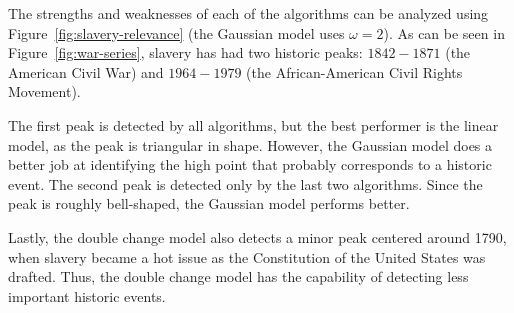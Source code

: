 The strengths and weaknesses of each of the algorithms can be analyzed using Figure~\ref{fig:slavery-relevance} (the Gaussian model uses $\omega = 2$). As can be seen in Figure~\ref{fig:war-series}, slavery has had two historic peaks: $1842 - 1871$ (the American Civil War) and $1964 - 1979$ (the African-American Civil Rights Movement).

The first peak is detected by all algorithms, but the best performer is the linear model, as the peak is triangular in shape. However, the Gaussian model does a better job at identifying the high point that probably corresponds to a historic event. The second peak is detected only by the last two algorithms. Since the peak is roughly bell-shaped, the Gaussian model performs better.

Lastly, the double change model also detects a minor peak centered around 1790, when slavery became a hot issue as the Constitution of the United States was drafted. Thus, the double change model has the capability of detecting less important historic events.
